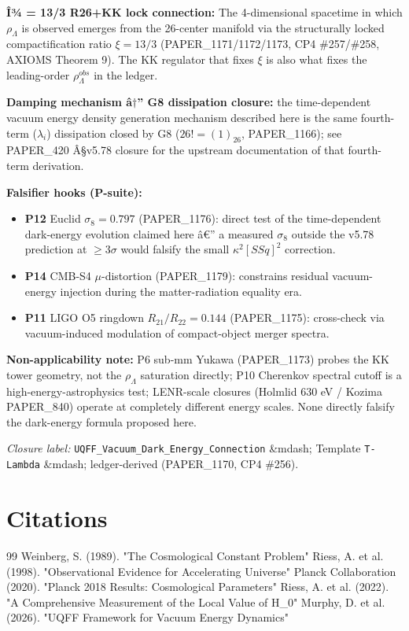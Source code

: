 \documentclass[12pt,a4paper]{article}
\begin{document}
\textbf{Î¾ = 13/3 R26+KK lock connection:} The 4-dimensional spacetime in which $\rho_\Lambda$ is observed emerges from the 26-center manifold via the structurally locked compactification ratio $\xi = 13/3$ (PAPER\_1171/1172/1173, CP4 \#257/\#258, AXIOMS Theorem 9). The KK regulator that fixes $\xi$ is also what fixes the leading-order $\rho_\Lambda^{obs}$ in the ledger.

\textbf{Damping mechanism â$\dagger$'' G8 dissipation closure:} the time-dependent vacuum energy density generation mechanism described here is the same fourth-term ($\lambda_i$) dissipation closed by G8 ($26! = (1)_{26}$, PAPER\_1166); see PAPER\_420 Â\S{}v5.78 closure for the upstream documentation of that fourth-term derivation.

\textbf{Falsifier hooks (P-suite):}

\begin{itemize}
  \item \textbf{P12} Euclid $\sigma_8 = 0.797$ (PAPER\_1176): direct test of the time-dependent dark-energy evolution claimed here â€'' a measured $\sigma_8$ outside the v5.78 prediction at $\geq 3\sigma$ would falsify the small $\kappa^2[SSq]^2$ correction.
  \item \textbf{P14} CMB-S4 $\mu$-distortion (PAPER\_1179): constrains residual vacuum-energy injection during the matter-radiation equality era.
  \item \textbf{P11} LIGO O5 ringdown $R_{21}/R_{22} = 0.144$ (PAPER\_1175): cross-check via vacuum-induced modulation of compact-object merger spectra.
\end{itemize}

\textbf{Non-applicability note:} P6 sub-mm Yukawa (PAPER\_1173) probes the KK tower geometry, not the $\rho_\Lambda$ saturation directly; P10 Cherenkov spectral cutoff is a high-energy-astrophysics test; LENR-scale closures (Holmlid 630 eV / Kozima PAPER\_840) operate at completely different energy scales. None directly falsify the dark-energy formula proposed here.

\emph{Closure label:} \texttt{UQFF\_Vacuum\_Dark\_Energy\_Connection} \&mdash; Template \texttt{T-Lambda} \&mdash; ledger-derived (PAPER\_1170, CP4 \#256).


\section*{Citations}
\begin{thebibliography}{99}
 Weinberg, S. (1989). "The Cosmological Constant Problem"
 Riess, A. et al. (1998). "Observational Evidence for Accelerating Universe"
 Planck Collaboration (2020). "Planck 2018 Results: Cosmological Parameters"
 Riess, A. et al. (2022). "A Comprehensive Measurement of the Local Value of H\_0"
 Murphy, D. et al. (2026). "UQFF Framework for Vacuum Energy Dynamics"
\end{thebibliography}
\end{document}
